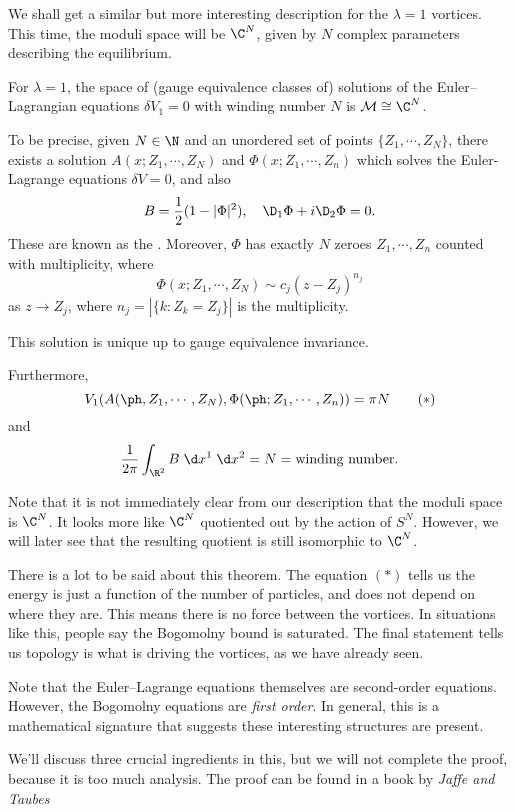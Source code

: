 \documentclass[a4paper]{article}
\begin{document}
We shall get a similar but more interesting description for the $\lambda = 1$ vortices. This time, the moduli space will be $\C^N$, given by $N$ complex parameters describing the equilibrium.

\begin{thm}
  For $\lambda = 1$, the space of (gauge equivalence classes of) solutions of the Euler--Lagrangian equations $\delta V_1 = 0$ with winding number $N$ is $\mathcal{M} \cong \C^N$.
  
  To be precise, given $N \in \N$ and an unordered set of points $\{Z_1, \cdots, Z_N\}$, there exists a solution $A(x; Z_1, \cdots, Z_N)$ and $\Phi(x; Z_1, \cdots, Z_n)$ which solves the Euler-Lagrange equations $\delta V = 0$, and also
  \[
    B = \frac{1}{2} (1 - |\Phi|^2),\quad \D_1 \Phi + i \D_2 \Phi = 0.
  \]
  These are known as the . Moreover, $\Phi$ has exactly $N$ zeroes $Z_1, \cdots, Z_n$ counted with multiplicity, where
  \[
    \Phi(x; Z_1, \cdots, Z_N) \sim c_j (z - Z_j)^{n_j}
  \]
  as $z \to Z_j$, where $n_j = |\{k: Z_k = Z_j\}|$ is the multiplicity.

  This solution is unique up to gauge equivalence invariance.

  Furthermore,
  \[
    V_1(A(\ph, Z_1, \cdots, Z_N), \Phi(\ph; Z_1, \cdots, Z_n)) = \pi N\tag{$*$}
  \]
  and
  \[
    \frac{1}{2\pi} \int_{\R^2} B\;\d x^1 \;\d x^2 = N = \text{winding number}.
  \]
\end{thm}
Note that it is not immediately clear from our description that the moduli space is $\C^N$. It looks more like $\C^N$ quotiented out by the action of $S^N$. However, we will later see that the resulting quotient is still isomorphic to $\C^N$.

There is a lot to be said about this theorem. The equation $(*)$ tells us the energy is just a function of the number of particles, and does not depend on where they are. This means there is no force between the vortices. In situations like this, people say the Bogomolny bound is saturated. The final statement tells us topology is what is driving the vortices, as we have already seen.

Note that the Euler--Lagrange equations themselves are second-order equations. However, the Bogomolny equations are \emph{first order}. In general, this is a mathematical signature that suggests these interesting structures are present.

We'll discuss three crucial ingredients in this, but we will not complete the proof, because it is too much analysis. The proof can be found in a book by \emph{Jaffe and Taubes}
\end{document}
